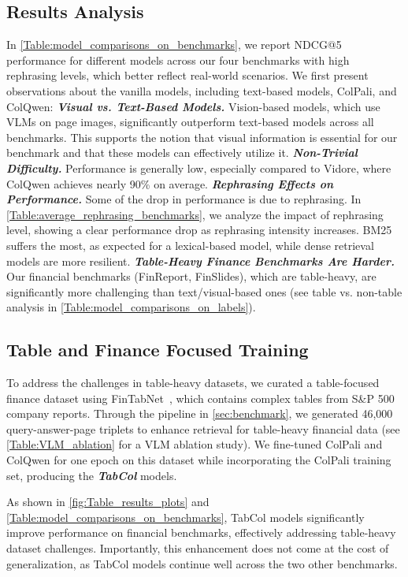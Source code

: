\subsection{Results Analysis}
In \cref{Table:model_comparisons_on_benchmarks}, we report NDCG@5 performance for different models across our four benchmarks with high rephrasing levels, which better reflect real-world scenarios. We first present observations about the vanilla models, including text-based models, ColPali, and ColQwen:
\emph{\textbf{Visual vs. Text-Based Models.} }
Vision-based models, which use VLMs on page images, significantly outperform text-based models across all benchmarks. This supports the notion that visual information is essential for our benchmark and that these models can effectively utilize it.  
\emph{\textbf{Non-Trivial Difficulty.}} Performance is generally low, especially compared to Vidore, where ColQwen achieves nearly 90\% on average.
\emph{\textbf{Rephrasing Effects on Performance.}} 
Some of the drop in performance is due to rephrasing.
In \cref{Table:average_rephrasing_benchmarks}, we analyze the impact of rephrasing level, showing a clear performance drop as rephrasing intensity increases. BM25 suffers the most, as expected for a lexical-based model, while dense retrieval models are more resilient.
\emph{\textbf{Table-Heavy Finance Benchmarks Are Harder.}}  
Our financial benchmarks (FinReport, FinSlides), which are table-heavy, are significantly more challenging than text/visual-based ones (see table vs. non-table analysis in \cref{Table:model_comparisons_on_labels}).





\subsection{Table and Finance Focused Training}  
To address the challenges in table-heavy datasets, we curated a table-focused finance dataset using FinTabNet~\citep{zheng2020global}, which contains complex tables from S\&P 500 company reports. Through the pipeline in \cref{sec:benchmark}, we generated 46,000 query-answer-page triplets to enhance retrieval for table-heavy financial data (see \cref{Table:VLM_ablation} for a VLM ablation study). We fine-tuned ColPali and ColQwen for one epoch on this dataset while incorporating the ColPali training set, producing the \textbf{\emph{TabCol}} models.

\vspace{0.1cm}
\noindent
As shown in \cref{fig:Table_results_plots} and \cref{Table:model_comparisons_on_benchmarks}, TabCol models significantly improve performance on financial benchmarks, effectively addressing table-heavy dataset challenges. Importantly, this enhancement does not come at the cost of generalization, as TabCol models continue well across the two other benchmarks. 

